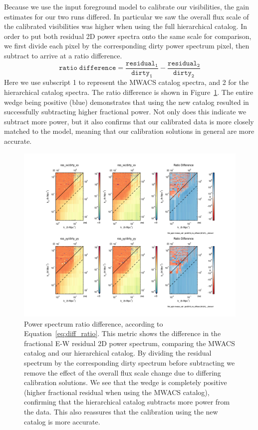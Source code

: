 \documentclass[iop]{emulateapj}
\begin{document}
Because we use the input foreground model to calibrate our visibilities, the gain estimates 
for our two runs differed. In particular we saw the overall flux scale of the calibrated 
visibilities was higher when using the full hierarchical catalog. In order to put both residual 
2D power spectra onto the same scale for comparison, we first divide each pixel by the 
corresponding dirty power spectrum pixel, then subtract to arrive at a ratio difference. 
\begin{equation}\label{eq:diff_ratio}
\mathtt{ratio\;difference = \frac{residual_1}{dirty_1} - \frac{residual_2}{dirty_2}}
\end{equation}
Here we use subscript 1 to represent the MWACS catalog spectra, and 2 for the 
hierarchical catalog spectra. The ratio difference is shown in Figure~\ref{fig:mwacs_ratio}. 
The entire wedge being positive (blue) demonstrates that using the new catalog resulted in 
successfully subtracting higher fractional power. Not only does this indicate we subtract 
more power, but it also confirms that our calibrated data is more closely matched to the 
model, meaning that our calibration solutions in general are more accurate.

\begin{figure}
\includegraphics[width=\columnwidth]{mwacs_ratio.pdf}
\caption{Power spectrum ratio difference, according to Equation~\ref{eq:diff_ratio}. This 
metric shows the difference in the fractional E-W residual 2D power spectrum, comparing 
the MWACS catalog and our hierarchical catalog. By dividing the residual spectrum by the 
corresponding dirty spectrum before subtracting we remove the effect of the overall flux 
scale change due to differing calibration solutions. We see that the wedge is completely 
positive (higher fractional residual when using the MWACS catalog), confirming that the 
hierarchical catalog subtracts more power from the data. This also reassures that the 
calibration using the new catalog is more accurate. 
\label{fig:mwacs_ratio}
}
\end{figure}
\end{document}
